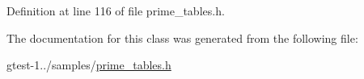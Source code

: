 \-Definition at line 116 of file prime\-\_\-tables.\-h.



\-The documentation for this class was generated from the following file\-:\begin{DoxyCompactItemize}
\item 
gtest-\/1../samples/\hyperlink{prime__tables_8h}{prime\-\_\-tables.\-h}\end{DoxyCompactItemize}
